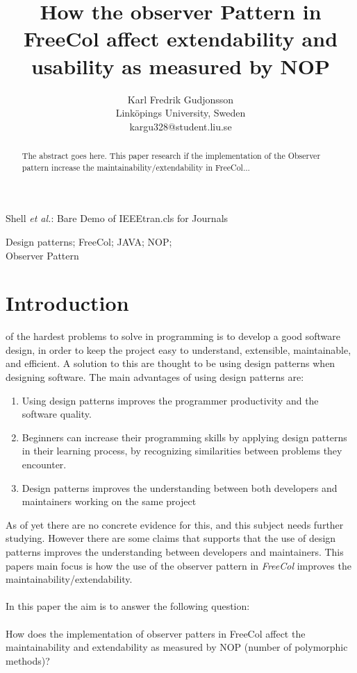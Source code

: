 \documentclass[journal]{IEEEtran}
\begin{document}
\title{ How the observer Pattern in FreeCol affect extendability and usability as measured by NOP}

\author{Karl Fredrik Gudjonsson\\
        Link\"{o}pings University, Sweden\\
        kargu328@student.liu.se
}
{Shell \MakeLowercase{\textit{et al.}}: Bare Demo of IEEEtran.cls for Journals}

\maketitle
\begin{abstract}
The abstract goes here. This paper research if the implementation of the Observer pattern increase the maintainability/extendability in FreeCol...
\end{abstract}

\begin{IEEEkeywords}
Design patterns; FreeCol; JAVA; NOP;\\ Observer Pattern
\end{IEEEkeywords}
\IEEEpeerreviewmaketitle
\section{Introduction}
 of the hardest problems to solve in programming is to develop a good software design, in order to keep the project easy to understand, extensible, maintainable, and efficient. A solution to this  are thought to be using design patterns when designing software. The main advantages of using design patterns are\cite{zhang2012we}:
\begin{enumerate}
\item {Using design patterns improves the programmer productivity and the software quality.}
\item{Beginners can increase their programming skills by applying design patterns in their learning process, by recognizing similarities between problems they encounter.}
\item{Design patterns improves the understanding between both developers and maintainers working on the same project}
\end{enumerate}

As of yet there are no concrete evidence for this, and this subject needs further studying. However there are some claims that supports that the use of design patterns improves the understanding between developers and maintainers. This papers main focus is how the use of the observer pattern in \textit{FreeCol} improves the maintainability/extendability.
\\
\\
In this paper the aim is to answer the following question:
\\
\\
How does the implementation of observer patters in FreeCol affect the maintainability and extendability as measured by NOP (number of polymorphic methods)?
\end{document}
